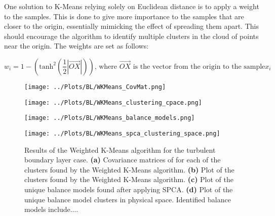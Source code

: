 \documentclass[12pt]{report} %
\begin{document}
One solution to K-Means relying solely on Euclidean distance is to apply a weight to the samples. This is done to give more importance to the samples that are closer to the origin, essentially mimicking the effect of spreading them apart. This should encourage the algorithm to identify multiple clusters in the cloud of points near the origin. The weights are set as follows:

\begin{equation}
  w_i = 1 - (\text{tanh}^{2}(\frac{1}{2}|\vec{OX}|)) \text{, where } \vec{OX} \text{ is the vector from the origin to the sample} x_i
\end{equation}

\begin{figure}[htbp]
  \centering

  \begin{minipage}{0.7\textwidth}
    \centering
    \texttt{[image: ../Plots/BL/WKMeans\_CovMat.png]}
    \subcaption{}
  \end{minipage}

  \begin{minipage}{\textwidth}
      \begin{minipage}[b]{0.6\textwidth}
          \centering
          \texttt{[image: ../Plots/BL/WKMeans\_clustering\_cpace.png]}
          \subcaption{}
      \end{minipage}
      \begin{minipage}[b]{0.35\textwidth}
          \centering
          \texttt{[image: ../Plots/BL/WKMeans\_balance\_models.png]}
          \subcaption{}
      \end{minipage}
  \end{minipage}

  \begin{minipage}{0.7\textwidth}
      \centering
      \texttt{[image: ../Plots/BL/WKMeans\_spca\_clustering\_space.png]}
      \subcaption{}
  \end{minipage}
  \caption{Results of the Weighted K-Means algorithm for the turbulent boundary layer case. \textbf{(a)} Covariance matrices of for each of the clusters found by the Weighted K-Means algorithm. \textbf{(b)} Plot of the clusters found by the Weighted K-Means algorithm. \textbf{(c)} Plot of the unique balance models found after applying SPCA. \textbf{(d)} Plot of the unique balance model clusters in physical space. Identified balance models include....}

  \label{fig:WKMeans_results}
\end{figure}
\end{document}
